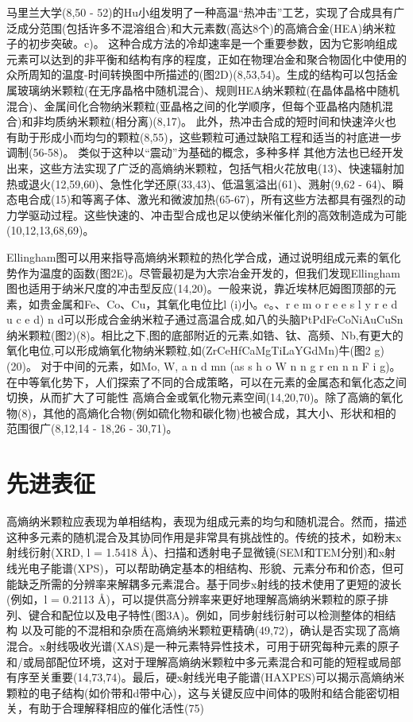\documentclass[a4paper]{article}
\begin{document}
马里兰大学(8,50 - 52)的Hu小组发明了一种高温“热冲击”工艺，实现了合成具有广泛成分范围(包括许多不混溶组合)和大元素数(高达8个)的高熵合金(HEA)纳米粒子的初步突破。c)。
这种合成方法的冷却速率是一个重要参数，因为它影响组成元素可以达到的非平衡和结构有序的程度，正如在物理冶金和聚合物固化中使用的众所周知的温度-时间转换图中所描述的(图2D)(8,53,54)。生成的结构可以包括金属玻璃纳米颗粒(在无序晶格中随机混合)、规则HEA纳米颗粒(在晶体晶格中随机混合)、金属间化合物纳米颗粒(亚晶格之间的化学顺序，但每个亚晶格内随机混合)和非均质纳米颗粒(相分离)(8,17)。
此外，热冲击合成的短时间和快速淬火也有助于形成小而均匀的颗粒(8,55)，这些颗粒可通过缺陷工程和适当的衬底进一步调制(56-58)。
类似于这种以“震动”为基础的概念，多种多样
其他方法也已经开发出来，这些方法实现了广泛的高熵纳米颗粒，包括气相火花放电(13)、快速辐射加热或退火(12,59,60)、急性化学还原(33,43)、低温氢溢出(61)、溅射(9,62 - 64)、瞬态电合成(15)和等离子体、激光和微波加热(65-67)，所有这些方法都具有强烈的动力学驱动过程。这些快速的、冲击型合成也足以使纳米催化剂的高效制造成为可能(10,12,13,68,69)。



Ellingham图可以用来指导高熵纳米颗粒的热化学合成，通过说明组成元素的氧化势作为温度的函数(图2E)。尽管最初是为大宗冶金开发的，但我们发现Ellingham图也适用于纳米尺度的冲击型反应(14,20)。一般来说，靠近埃林厄姆图顶部的元素，如贵金属和Fe、Co、Cu，其氧化电位比l (i)小。e。、r e m o r e e s l y r e d u c e d) n d可以形成合金纳米粒子通过高温合成,如八的头脑PtPdFeCoNiAuCuSn纳米颗粒(图2)(8)。相比之下,图的底部附近的元素,如锆、钛、高频、Nb,有更大的氧化电位,可以形成熵氧化物纳米颗粒,如(ZrCeHfCaMgTiLaYGdMn)牛(图2 g)(20)。
对于中间的元素，如Mo, W, a n d mn (as s h o W n n g r en n n F i g)。在中等氧化势下，人们探索了不同的合成策略，可以在元素的金属态和氧化态之间切换，从而扩大了可能性
高熵合金或氧化物元素空间(14,20,70)。除了高熵的氧化物(8)，其他的高熵化合物(例如硫化物和碳化物)也被合成，其大小、形状和相的范围很广(8,12,14 - 18,26 - 30,71)。

\section*{先进表征}

高熵纳米颗粒应表现为单相结构，表现为组成元素的均匀和随机混合。然而，描述这种多元素的随机混合及其协同作用是非常具有挑战性的。传统的技术，如粉末x射线衍射(XRD, l = 1.5418 Å)、扫描和透射电子显微镜(SEM和TEM分别)和x射线光电子能谱(XPS)，可以帮助确定基本的相结构、形貌、元素分布和价态，但可能缺乏所需的分辨率来解耦多元素混合。基于同步x射线的技术使用了更短的波长(例如，l = 0.2113 Å)，可以提供高分辨率来更好地理解高熵纳米颗粒的原子排列、键合和配位以及电子特性(图3A)。例如，同步射线衍射可以检测整体的相结构
以及可能的不混相和杂质在高熵纳米颗粒更精确(49,72)，确认是否实现了高熵混合。x射线吸收光谱(XAS)是一种元素特异性技术，可用于研究每种元素的原子和/或局部配位环境，这对于理解高熵纳米颗粒中多元素混合和可能的短程或局部有序至关重要(14,73,74)。最后，硬x射线光电子能谱(HAXPES)可以揭示高熵纳米颗粒的电子结构(如价带和d带中心)，这与关键反应中间体的吸附和结合能密切相关，有助于合理解释相应的催化活性(75)
\end{document}
